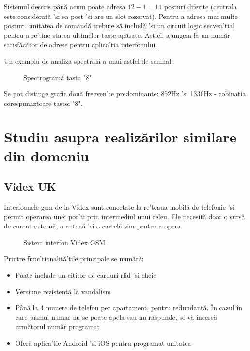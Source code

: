 Sistemul descris până acum poate adresa $12-1=11$ posturi diferite (centrala este considerată 'si ea post 'si are un slot rezervat). Pentru a adresa mai multe posturi, unitatea de comandă trebuie să includă 'si un circuit logic secven'tial pentru a re'tine starea ultimelor taste apăsate. Astfel, ajungem la un număr satisfăcător de adrese pentru aplica'tia interfonului. 

Un exemplu de analiza spectrală a unui astfel de semnal:

\begin{figure}[h!]
  \centering
  \caption{Spectrogramă tasta "8" \cite{AunsriNattapol2016}}
\end{figure}

Se pot distinge grafic două frecven'te predominante: 852Hz 'si 1336Hz - cobinatia corespunaztoare tastei "8".

\section {Studiu asupra realizărilor similare din domeniu}


\subsection {Videx UK}

Interfoanele \acrshort{gsm} de la Videx sunt conectate la re'teaua mobilă de telefonie 'si permit operarea unei por'ti prin intermediul unui releu. Ele necesită doar o sursă de curent externă, o antenă 'si o cartelă \acrfull{sim} pentru a opera.

\begin{figure}[h!]
  \centering
  \caption{Sistem interfon Videx GSM \cite{VidexUk}}
\end{figure}

Printre func'tionalită'tile principale se numără:
\begin{itemize}
  \item Poate include un cititor de carduri \acrshort{rfid} 'si cheie
  \item Versiune rezistentă la vandalism
  \item Până la 4 numere de telefon per apartament, pentru redundantă. În cazul în care primul număr nu se poate apela sau nu răspunde, se vă încercă următorul număr programat
  \item Oferă aplica'tie Android 'si iOS pentru programat unitatea
\end{itemize}

